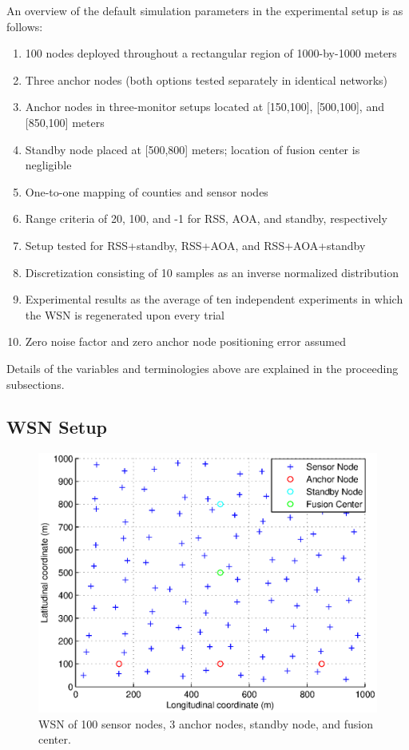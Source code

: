 \documentclass[12pt]{uthesis-v12}  %
\begin{document}
An overview of the default simulation parameters in the experimental setup is as follows:

\begin{enumerate}
  \item 100 nodes deployed throughout a rectangular region of 1000-by-1000 meters
  \item Three anchor nodes (both options tested separately in identical networks)
  \item Anchor nodes in three-monitor setups located at [150,100], [500,100], and [850,100] meters
  \item Standby node placed at [500,800] meters; location of fusion center is negligible
  \item One-to-one mapping of counties and sensor nodes
  \item Range criteria of 20, 100, and -1 for RSS, AOA, and standby, respectively
  \item Setup tested for RSS+standby, RSS+AOA, and RSS+AOA+standby
  \item Discretization consisting of 10 samples as an inverse normalized distribution
  \item Experimental results as the average of ten independent experiments in which the WSN is regenerated upon every trial
  \item Zero noise factor and zero anchor node positioning error assumed
\end{enumerate}

Details of the variables and terminologies above are explained in the proceeding subsections.

\subsection{WSN Setup}

\begin{figure}[!t]
\centering
\includegraphics[width=6in]{wsn-plot1}
\caption{WSN of 100 sensor nodes, 3 anchor nodes, standby node, and fusion center.}
\label{wsn}
\end{figure}
\end{document}
